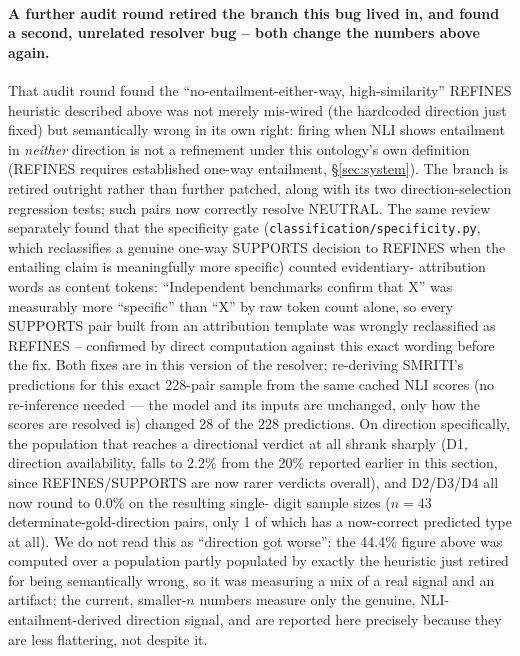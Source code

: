 \paragraph{A further audit round retired the branch this bug
lived in, and found a second, unrelated resolver bug -- both change the
numbers above again.} That audit round found the
``no-entailment-either-way, high-similarity'' REFINES heuristic described
above was not merely mis-wired (the hardcoded direction just fixed) but
semantically wrong in its own right: firing when NLI shows entailment in
\emph{neither} direction is not a refinement under this ontology's own
definition (REFINES requires established one-way entailment,
\S\ref{sec:system}). The branch is retired outright rather than further
patched, along with its two direction-selection regression tests; such
pairs now correctly resolve NEUTRAL. The same review separately found
that the specificity gate (\texttt{classification/specificity.py}, which
reclassifies a genuine one-way SUPPORTS decision to REFINES when the
entailing claim is meaningfully more specific) counted evidentiary-
attribution words as content tokens: ``Independent benchmarks confirm
that X'' was measurably more ``specific'' than ``X'' by raw token count
alone, so every SUPPORTS pair built from an attribution template was
wrongly reclassified as REFINES -- confirmed by direct computation
against this exact wording before the fix. Both fixes are in this
version of the resolver; re-deriving SMRITI's predictions for this exact
228-pair sample from the same cached NLI scores (no re-inference needed
--- the model and its inputs are unchanged, only how the scores are
resolved is) changed 28 of the 228 predictions. On direction specifically,
the population that reaches a directional verdict at all shrank sharply
(D1, direction availability, falls to 2.2\% from the 20\% reported
earlier in this section, since REFINES/SUPPORTS are now rarer verdicts
overall), and D2/D3/D4 all now round to 0.0\% on the resulting single-
digit sample sizes ($n=43$ determinate-gold-direction pairs, only 1 of
which has a now-correct predicted type at all). We do not read this as
``direction got worse'': the 44.4\% figure above was computed over a
population partly populated by exactly the heuristic just retired for
being semantically wrong, so it was measuring a mix of a real signal and
an artifact; the current, smaller-$n$ numbers measure only the genuine,
NLI-entailment-derived direction signal, and are reported here precisely
because they are less flattering, not despite it.

